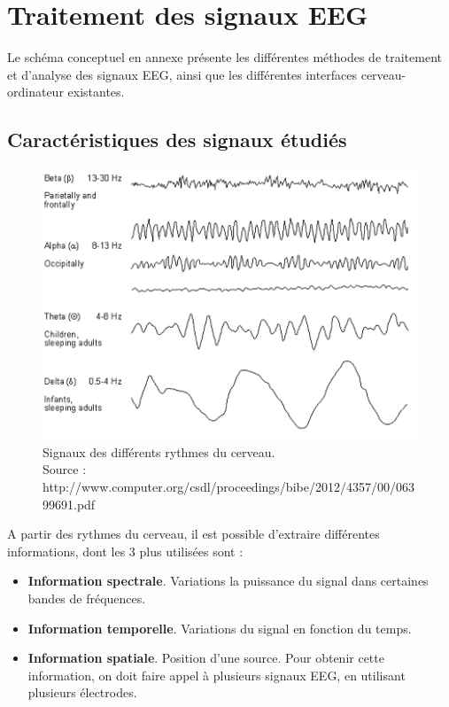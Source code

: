 \chapter{Traitement des signaux EEG}
\label{Chapitre : Traitement des signaux EEG}
\thispagestyle{fancy}

Le schéma conceptuel en annexe présente les différentes méthodes de traitement et d'analyse des signaux EEG, ainsi que les différentes interfaces cerveau-ordinateur existantes. 

\section{Caractéristiques des signaux étudiés}
\label{Section : 4.Caractéristiques des signaux étudiés}

\begin{figure}[h]
	\centering\includegraphics[width=12cm]{images/rythmesCerveau.png}
	\caption[Signaux des différents rythmes du cerveau]{Signaux des différents rythmes du cerveau.\\Source : http://www.computer.org/csdl/proceedings/bibe/2012/4357/00/06399691.pdf}
\end{figure}

A partir des rythmes du cerveau, il est possible d'extraire différentes informations, dont les 3 plus utilisées sont : 

\begin{itemize}
	\item \textbf{Information spectrale}. Variations la puissance du signal dans certaines bandes de fréquences.
	\smallbreak
	\item \textbf{Information temporelle}. Variations du signal en fonction du temps. 
	\smallbreak
	\item \textbf{Information spatiale}. Position d'une source. Pour obtenir cette information, on doit faire appel à plusieurs signaux EEG, en utilisant plusieurs électrodes.  
\end{itemize}

